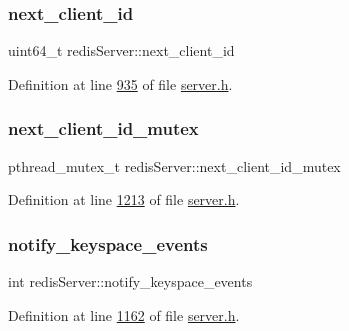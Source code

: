 \subsubsection{\texorpdfstring{next\+\_\+client\+\_\+id}{next\_client\_id}}
{\footnotesize\ttfamily uint64\+\_\+t redis\+Server\+::next\+\_\+client\+\_\+id}



Definition at line \hyperlink{server_8h_source_l00935}{935} of file \hyperlink{server_8h_source}{server.\+h}.

\mbox{\label{structredisServer_a0ef4857fd7df45d2c64ec3b1774482f8}} 
\subsubsection{\texorpdfstring{next\+\_\+client\+\_\+id\+\_\+mutex}{next\_client\_id\_mutex}}
{\footnotesize\ttfamily pthread\+\_\+mutex\+\_\+t redis\+Server\+::next\+\_\+client\+\_\+id\+\_\+mutex}



Definition at line \hyperlink{server_8h_source_l01213}{1213} of file \hyperlink{server_8h_source}{server.\+h}.

\mbox{\label{structredisServer_a12c72a2d7e22f4dda75271cac7af959e}} 
\subsubsection{\texorpdfstring{notify\+\_\+keyspace\+\_\+events}{notify\_keyspace\_events}}
{\footnotesize\ttfamily int redis\+Server\+::notify\+\_\+keyspace\+\_\+events}



Definition at line \hyperlink{server_8h_source_l01162}{1162} of file \hyperlink{server_8h_source}{server.\+h}.

\mbox{\label{structredisServer_afae2542f9a8fd6b0ed77845fdb9a308c}} 

